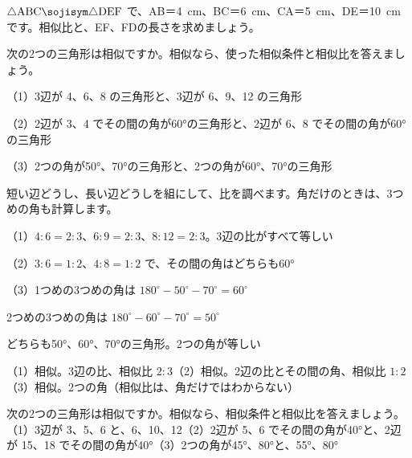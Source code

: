 \begin{jibun}
$\triangle\mathrm{ABC}\sojisym\triangle\mathrm{DEF}$ で、AB＝\qty{4}{cm}、BC＝\qty{6}{cm}、CA＝\qty{5}{cm}、DE＝\qty{10}{cm}です。相似比と、EF、FDの長さを求めましょう。
\end{jibun}

\begin{reidai}[相似条件を見つける]
次の2つの三角形は相似ですか。相似なら、使った相似条件と相似比を答えましょう。\par
（1）\nobreak 3辺が 4、6、8 の三角形と、3辺が 6、9、12 の三角形\par
（2）\nobreak 2辺が 3、4 でその間の角が60°の三角形と、2辺が 6、8 でその間の角が60°の三角形\par
（3）\nobreak 2つの角が50°、70°の三角形と、2つの角が60°、70°の三角形\par
\kangaekata 短い辺どうし、長い辺どうしを組にして、比を調べます。角だけのときは、3つめの角も計算します。\par
\shiki （1）$4:6=2:3$、$6:9=2:3$、$8:12=2:3$。3辺の比がすべて等しい\par
\hspace*{2.6\zw}（2）$3:6=1:2$、$4:8=1:2$ で、その間の角はどちらも60°\par
\hspace*{2.6\zw}（3）1つめの3つめの角は $180^{\circ}-50^{\circ}-70^{\circ}=60^{\circ}$\par
\hspace*{4.3\zw}2つめの3つめの角は $180^{\circ}-60^{\circ}-70^{\circ}=50^{\circ}$\par
\hspace*{4.3\zw}どちらも50°、60°、70°の三角形。2つの角が等しい\par
\kotae （1）\nobreak 相似。3辺の比、相似比 $2:3$\quad（2）\nobreak 相似。2辺の比とその間の角、相似比 $1:2$\quad（3）\nobreak 相似。2つの角（相似比は、角だけではわからない）
\end{reidai}

\begin{jibun}
次の2つの三角形は相似ですか。相似なら、相似条件と相似比を答えましょう。（1）\nobreak 3辺が 3、5、6 と、6、10、12\quad（2）\nobreak 2辺が 5、6 でその間の角が40°と、2辺が 15、18 でその間の角が40°\quad（3）\nobreak 2つの角が45°、80°と、55°、80°
\end{jibun}

